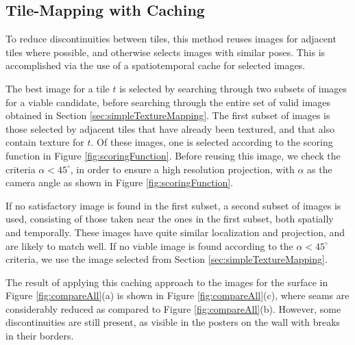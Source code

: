 \documentclass{llncs}
\begin{document}
\subsection{Tile-Mapping with Caching}
\label{sec:mappingWithCaching}
To reduce discontinuities between tiles, this method reuses images for
adjacent tiles where possible, and otherwise selects images with
similar poses. This is accomplished via the use of a spatiotemporal
cache for selected images.

The best image for a tile $t$ is selected by searching through two
subsets of images for a viable candidate, before searching through the
entire set of valid images obtained in Section
\ref{sec:simpleTextureMapping}. The first subset of images is those
selected by adjacent tiles that have already been textured, and that
also contain texture for $t$. Of these images, one is selected
according to the scoring function in Figure
\ref{fig:scoringFunction}. Before reusing this image, we check the
criteria $\alpha < 45^\circ$, in order to ensure a high resolution
projection, with $\alpha$ as the camera angle as shown in Figure
\ref{fig:scoringFunction}.

If no satisfactory image is found in the first subset, a second subset
of images is used, consisting of those taken near the ones in the
first subset, both spatially and temporally. These images have quite
similar localization and projection, and are likely to match
well. If no viable image is found according to the $\alpha < 45^\circ$
criteria, we use the image selected from Section
\ref{sec:simpleTextureMapping}.

The result of applying this caching approach to the images for the
surface in Figure \ref{fig:compareAll}(a) is shown in Figure
\ref{fig:compareAll}(c), where seams are considerably reduced as
compared to Figure \ref{fig:compareAll}(b). However, some
discontinuities are still present, as visible in the posters on the
wall with breaks in their borders.
\end{document}
